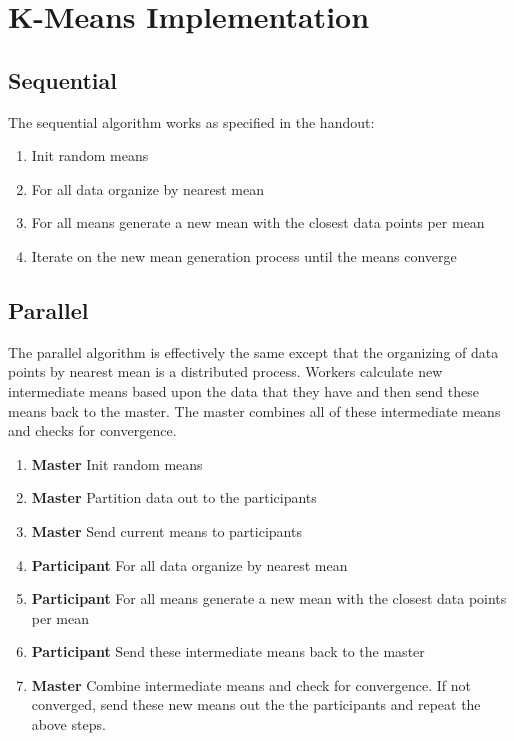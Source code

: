 \documentclass[12pt]{article}
\begin{document}
\section{K-Means Implementation}

\subsection{Sequential}
The sequential algorithm works as specified in the handout:

\begin{enumerate}

\item
Init random means

\item
For all data organize by nearest mean

\item
For all means generate a new mean with the closest data points per mean

\item
Iterate on the new mean generation process until the means converge

\end{enumerate}

\subsection{Parallel}

The parallel algorithm is effectively the same except that the organizing of data points by nearest mean is a distributed process. Workers calculate new intermediate means based upon the data that they have and then send these means back to the master. The master combines all of these intermediate means and checks for convergence.

\begin{enumerate}[leftmargin=*,align=left] 

\item
\textbf{Master} Init random means

\item
\textbf{Master} Partition data out to the participants

\item
\textbf{Master} Send current means to participants

\item
\textbf{Participant} For all data organize by nearest mean

\item
\textbf{Participant} For all means generate a new mean with the closest data points per mean

\item
\textbf{Participant} Send these intermediate means back to the master

\item
\textbf{Master} Combine intermediate means and check for convergence. If not converged, send these new means out the the participants and repeat the above steps.

\end{enumerate}
\end{document}
